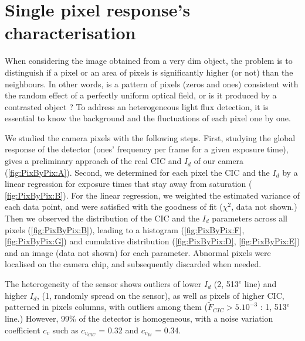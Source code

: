 
\section{Single pixel response's characterisation \label{sec:SinglePixCaract}}

When considering the image obtained from a very dim object, the problem is to distinguish if a pixel or an area of pixels is significantly higher (or not) than the neighbours. In other words, is a pattern of pixels (zeros and ones) consistent with the random effect of a perfectly uniform optical field, or is it produced by a contrasted object ? 
To address an heterogeneous light flux detection, it is essential to know the background and the fluctuations of each pixel one by one. \par

We studied the camera pixels with the following steps. 
First, studying the global response of the detector (ones' frequency per frame for a given exposure time), gives a preliminary approach of the real CIC and $I_{d}$ of our camera (\ref{fig:PixByPix:A}).
Second, we determined for each pixel the CIC and the $I_{d}$ by a linear regression for exposure times that stay away from saturation ( \ref{fig:PixByPix:B}). For the linear regression, we weighted the estimated variance of each data point, and were satisfied with the goodness of fit ($\chi^2$, data not shown.) 
Then we observed the distribution of the  CIC and the $I_{d}$ parameters across all pixels (\ref{fig:PixByPix:B}), leading to a histogram (\ref{fig:PixByPix:F}, \ref{fig:PixByPix:G}) and cumulative distribution (\ref{fig:PixByPix:D}, \ref{fig:PixByPix:E})  and an image (data not shown) for each parameter. Abnormal pixels were localised on the camera chip, and subsequently discarded when needed.\par

The heterogeneity of the sensor shows outliers of lower $I_{d}$ (2\textperthousand, 513$^e$ line) and higher $I_{d}$, (1\textperthousand, randomly spread on the sensor), as well as pixels of higher CIC, patterned in pixels columns, with outliers among them ($\tilde{F}_{CIC} > 5.10^{-3}$ : 1\textperthousand, 513$^e$ line.) However, 99\% of the detector is homogeneous, with a noise variation coefficient $c_v$ such as $c_v_{CIC}$ = 0.32 and  $c_v_{Id}$ = 0.34. \par
\medskip

